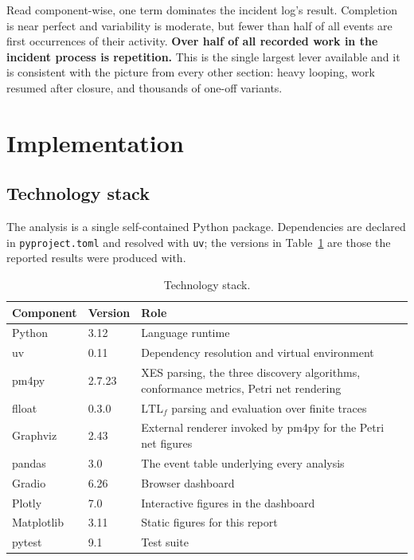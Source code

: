 \documentclass[12pt,a4paper]{article}
\begin{document}
Read component-wise, one term dominates the incident log's result. Completion is
near perfect and variability is moderate, but fewer than half of all events are
first occurrences of their activity. \textbf{Over half of all recorded work in
the incident process is repetition.} This is the single largest lever available
and it is consistent with the picture from every other section: heavy looping,
work resumed after closure, and thousands of one-off variants.

\section{Implementation}\label{sec:architecture}

\subsection{Technology stack}

The analysis is a single self-contained Python package. Dependencies are
declared in \texttt{pyproject.toml} and resolved with \texttt{uv}; the versions
in Table~\ref{tab:stack} are those the reported results were produced with.

\begin{table}[H]
\centering
\small
\begin{tabular}{llp{7.2cm}}
\toprule
Component & Version & Role \\
\midrule
Python        & 3.12    & Language runtime \\
uv            & 0.11    & Dependency resolution and virtual environment \\
pm4py         & 2.7.23  & XES parsing, the three discovery algorithms, conformance metrics, Petri net rendering \\
flloat        & 0.3.0   & $\text{LTL}_f$ parsing and evaluation over finite traces \\
Graphviz      & 2.43    & External renderer invoked by pm4py for the Petri net figures \\
pandas        & 3.0     & The event table underlying every analysis \\
Gradio        & 6.26    & Browser dashboard \\
Plotly        & 7.0     & Interactive figures in the dashboard \\
Matplotlib    & 3.11    & Static figures for this report \\
pytest        & 9.1     & Test suite \\
\bottomrule
\end{tabular}
\caption{Technology stack.}
\label{tab:stack}
\end{table}
\end{document}
